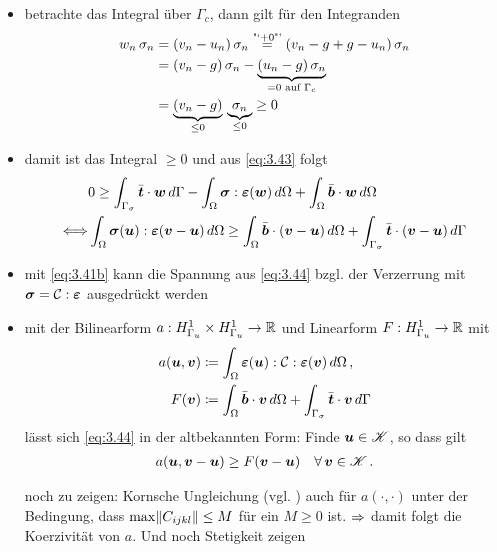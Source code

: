 \begin{itemize}
\item betrachte das Integral über $\Gamma_c$, dann gilt für den Integranden
\begin{align*}
	w_n \, \sigma_n &= (v_n - u_n) \, \sigma_n \stackrel{\scriptsize\text{"`}+0\text{"'}}= (v_n-g+g-u_n) \, \sigma_n  \\
	& =(v_n - g) \, \sigma_n - \underbrace{(u_n-g) \, \sigma_n}_{=0 \text{ auf } \Gamma_c} \\
	&  =\underbrace{ (v_n-g)}_{\le 0} \, \underbrace{\sigma_n}_{\le 0} \ge 0
\end{align*}

\item damit ist das Integral $\ge 0$ und aus \eqref{eq:3.43} folgt
\begin{align}\notag
	& 0 \ge \int_{\Gamma_\sigma} \bar{\boldsymbol t} \cdot \boldsymbol w \, d\Gamma-\int_\Omega \boldsymbol\sigma: \boldsymbol {\varepsilon}(\boldsymbol w) \, d\Omega + \int_\Omega \bar{\boldsymbol b} \cdot \boldsymbol w \, d\Omega \\
	\label{eq:3.44}
	\Longleftrightarrow& \int_\Omega \boldsymbol\sigma(\boldsymbol u): \boldsymbol {\varepsilon}(\boldsymbol v - \boldsymbol u) \, d\Omega \ge\int_\Omega \bar{\boldsymbol b} \cdot (\boldsymbol v-\boldsymbol u) \, d\Omega+ \int_{\Gamma_\sigma} \bar{\boldsymbol t} \cdot (\boldsymbol v-\boldsymbol u) \, d\Gamma 
\end{align}

\item mit \eqref{eq:3.41b} kann die Spannung aus \eqref{eq:3.44} bzgl. der Verzerrung mit $\boldsymbol\sigma = \mathcal C : \boldsymbol{\varepsilon}$ ausgedrückt werden

\item mit der Bilinearform $a: H^1_{\Gamma_u} \times H^1_{\Gamma_u} \rightarrow \mathbb{R}$ und Linearform $F: H^1_{\Gamma_u} \rightarrow \mathbb{R}$ mit
\begin{align*}
	a(\boldsymbol u,\boldsymbol v) &\coloneqq \int_\Omega \boldsymbol{\varepsilon} (\boldsymbol u) : \mathcal C : \boldsymbol{\varepsilon}(\boldsymbol v) \, d\Omega \, ,\\ 
	 F(\boldsymbol v)& \coloneqq \int_\Omega \bar{\boldsymbol b} \cdot \boldsymbol v \, d\Omega + \int_{\Gamma_\sigma} \bar{\boldsymbol t} \cdot \boldsymbol v \, d\Gamma 
\end{align*}
lässt sich \eqref{eq:3.44} in der altbekannten Form: Finde $\boldsymbol u \in \mathscr K$, so dass gilt
\begin{align}\label{eq:3.45}
	a(\boldsymbol u, \boldsymbol v - \boldsymbol u) \ge F(\boldsymbol v- \boldsymbol u) \quad \forall \, \boldsymbol v \in \mathscr K \, .
\end{align}

\item[noch zu zeigen:] Kornsche Ungleichung (vgl. \cite{BraeFEM}) auch für $a(\cdot,\cdot)$ unter der Bedingung, dass $\max \lVert C_{ijkl}\rVert \le M$ für ein $M\ge 0$ ist. $\Rightarrow$ damit folgt die Koerzivität von $a$. Und noch Stetigkeit zeigen


\end{itemize}
